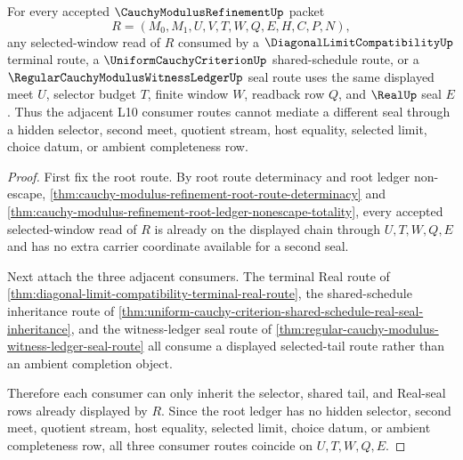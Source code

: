\begin{theorem}
\label{thm:cauchy-modulus-refinement-shared-tail-selector-seal-coherence}
For every accepted $\CauchyModulusRefinementUp$ packet
$$
R=(M_0,M_1,U,V,T,W,Q,E,H,C,P,N),
$$
any selected-window read of $R$ consumed by a $\DiagonalLimitCompatibilityUp$ terminal route, a $\UniformCauchyCriterionUp$ shared-schedule route, or a $\RegularCauchyModulusWitnessLedgerUp$ seal route uses the same displayed meet $U$, selector budget $T$, finite window $W$, readback row $Q$, and $\RealUp$ seal $E$. Thus the adjacent L10 consumer routes cannot mediate a different seal through a hidden selector, second meet, quotient stream, host equality, selected limit, choice datum, or ambient completeness row.
\end{theorem}
\begin{proof}
First fix the root route. By root route determinacy and root ledger non-escape, \autoref{thm:cauchy-modulus-refinement-root-route-determinacy} and \autoref{thm:cauchy-modulus-refinement-root-ledger-nonescape-totality}, every accepted selected-window read of $R$ is already on the displayed chain through $U,T,W,Q,E$ and has no extra carrier coordinate available for a second seal.

Next attach the three adjacent consumers. The terminal Real route of \autoref{thm:diagonal-limit-compatibility-terminal-real-route}, the shared-schedule inheritance route of \autoref{thm:uniform-cauchy-criterion-shared-schedule-real-seal-inheritance}, and the witness-ledger seal route of \autoref{thm:regular-cauchy-modulus-witness-ledger-seal-route} all consume a displayed selected-tail route rather than an ambient completion object.

Therefore each consumer can only inherit the selector, shared tail, and Real-seal rows already displayed by $R$. Since the root ledger has no hidden selector, second meet, quotient stream, host equality, selected limit, choice datum, or ambient completeness row, all three consumer routes coincide on $U,T,W,Q,E$.
\end{proof}

